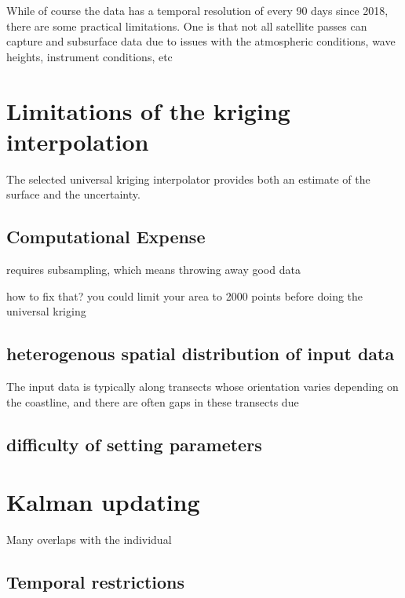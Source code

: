 While of course the data has a temporal resolution of every 90 days since 2018, there are some practical limitations. One is that not all satellite passes can capture and subsurface data due to issues with the atmospheric conditions, wave heights, instrument conditions, etc 

\section{Limitations of the kriging interpolation}

The selected universal kriging interpolator provides both an estimate of the surface and the uncertainty. 
\subsection{Computational Expense}
requires subsampling, which means throwing away good data

how to fix that? you could limit your area to 2000 points before doing the universal kriging 
\subsection{heterogenous spatial distribution of input data}

The input data is typically along transects whose orientation varies depending on the coastline, and there are often gaps in these transects due 
\subsection{difficulty of setting parameters}

\section{Kalman updating}
Many overlaps with the individual 
\subsection{Temporal restrictions}
